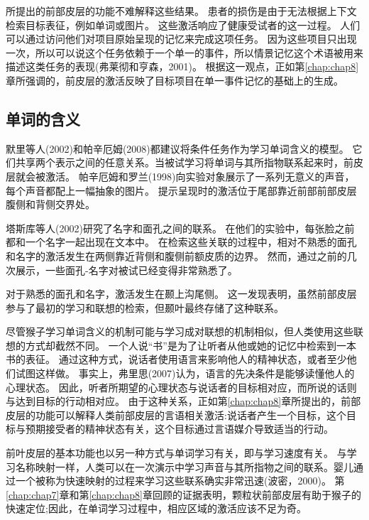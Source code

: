 所提出的前部皮层的功能不难解释这些结果。
患者的损伤是由于无法根据上下文检索目标表征，例如单词或图片。
这些激活响应了健康受试者的这一过程。
人们可以通过访问他们对项目原始呈现的记忆来完成这项任务。
因为这些项目只出现一次，所以可以说这个任务依赖于一个单一的事件，所以情景记忆这个术语被用来描述这类任务的表现(弗莱彻和亨森，2001)。
根据这一观点，正如第\ref{chap:chap8}章所强调的，前皮层的激活反映了目标项目在单一事件记忆的基础上的生成。
\par



\subsection{单词的含义}

默里等人(2002)和帕辛厄姆(2008)都建议将条件任务作为学习单词含义的模型。
它们共享两个表示之间的任意关系。当被试学习将单词与其所指物联系起来时，前皮层就会被激活。
帕辛厄姆和罗兰(1998)向实验对象展示了一系列无意义的声音，每个声音都配上一幅抽象的图片。
提示呈现时的激活位于尾部靠近前部前部皮层腹侧和背侧交界处。
\par


塔斯库等人(2002)研究了名字和面孔之间的联系。
在他们的实验中，每张脸之前都和一个名字一起出现在文本中。
在检索这些关联的过程中，相对不熟悉的面孔和名字的激活发生在两侧靠近背侧和腹侧前额皮质的边界。
然而，通过之前的几次展示，一些面孔-名字对被试已经变得非常熟悉了。
\par


对于熟悉的面孔和名字，激活发生在颞上沟尾侧。
这一发现表明，虽然前部皮层参与了最初的学习和联想的检索，但颞叶最终存储了这种联系。
\par

尽管猴子学习单词含义的机制可能与学习成对联想的机制相似，但人类使用这些联想的方式却截然不同。
一个人说“书”是为了让听者从他或她的记忆中检索到一本书的表征。
通过这种方式，说话者使用语言来影响他人的精神状态，或者至少他们试图这样做。
事实上，弗里思(2007)认为，语言的先决条件是能够读懂他人的心理状态。
因此，听者所期望的心理状态与说话者的目标相对应，而所说的话则与达到目标的行动相对应。
由于这种关系，正如第\ref{chap:chap8}章所提出的，前部皮层的功能可以解释人类前部皮层的言语相关激活:说话者产生一个目标，这个目标与预期接受者的精神状态有关，这个目标通过言语媒介导致适当的行动。
\par


前叶皮层的基本功能也以另一种方式与单词学习有关，即与学习速度有关。
与学习名称映射一样，人类可以在一次演示中学习声音与其所指物之间的联系。婴儿通过一个被称为快速映射的过程来学习这些联系确实非常迅速(波密，2000)。
第\ref{chap:chap7}章和第\ref{chap:chap8}章回顾的证据表明，颗粒状前部皮层有助于猴子的快速定位;因此，在单词学习过程中，相应区域的激活应该不足为奇。



